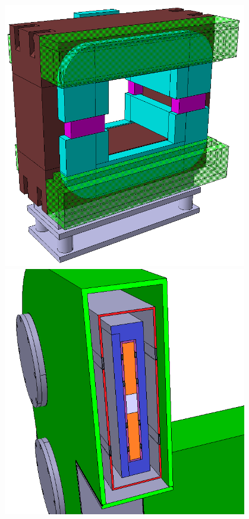 \begin{figure}[H]
\begin{minipage}[b]{0.495\textwidth}
\includegraphics[width=0.95\textwidth]{pictures/Old_magnet_2.png}
\caption{}
\label{fig:OldCbmMagnet1}
\end{minipage}
\hspace{0.01\textwidth}
\begin{minipage}[b]{0.495\textwidth}
\includegraphics[width=0.95\textwidth]{pictures/Old_magnet_coils.png}
\caption{}
\label{fig:OldCbmMagnet2}
\end{minipage}
\end{figure}

